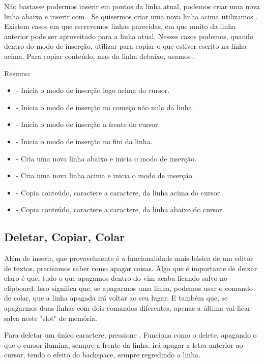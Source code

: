 Não bastasse podermos inserir em pontos da linha atual, podemos criar uma nova linha abaixo e inserir com .
Se quisermos criar uma nova linha acima utilizamos .
Existem casos em que escrevemos linhas parecidas, em que muito da linha anterior pode ser aproveitado para a linha atual.
Nesses casos podemos, quando dentro do modo de inserção, utilizar  para copiar o que estiver escrito
na linha acima. Para copiar conteúdo, mas da linha debaixo, usamos .

Resumo:
\begin{itemize}
    \item {} - Inicia o modo de inserção logo acima do cursor.
    \item {} - Inicia o modo de inserção no começo não nulo da linha.
    \item {} - Inicia o modo de inserção a frente do cursor.
    \item {} - Inicia o modo de inserção no fim da linha.
    \item {} - Cria uma nova linha abaixo e inicia o modo de inserção.
    \item {} - Cria uma nova linha acima e inicia o modo de inserção.
    \item {} - Copia conteúdo, caractere a caractere, da linha acima do cursor.
    \item {} - Copia conteúdo, caractere a caractere, da linha abaixo do cursor.
\end{itemize}

\subsection{Deletar, Copiar, Colar}
Além de inserir, que provavelmente é a funcionalidade mais básica de um editor de textos, precisamos saber como apagar coisas.
Algo que é importante de deixar claro é que, tudo o que apagamos dentro do vim acaba ficando salvo no clipboard.
Isso significa que, se apagarmos uma linha, podemos usar o comando de colar, que a linha apagada irá voltar ao seu lugar.
E também que, se apagarmos duas linhas com dois comandos diferentes, apenas a última vai ficar salva neste "slot" de memória.

Para deletar um único caractere, pressione .
Funciona como o delete, apagando o que o cursor ilumina, sempre a frente da linha.
 irá apagar a letra anterior ao cursor, tendo o efeito do backspace, sempre regredindo a linha.

